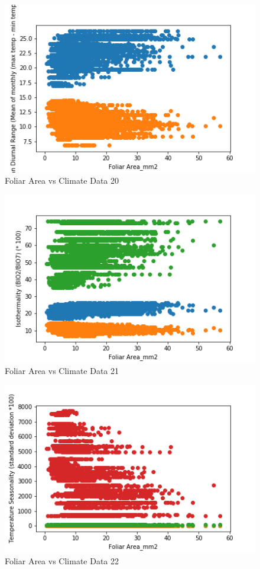 \documentclass[letterpaper]{article}
\begin{document}
\begin{figure}[h]
\caption{Foliar Area vs Climate Data 20\label{fig:Foliar_Area_vs_20}}
\centering
\includegraphics[width=0.7\paperwidth]{Foliar_Area_vs_20}
\end{figure}


\begin{figure}[h]
\caption{Foliar Area vs Climate Data 21\label{fig:Foliar_Area_vs_21}}
\centering
\includegraphics[width=0.7\paperwidth]{Foliar_Area_vs_21}
\end{figure}


\begin{figure}[h]
\caption{Foliar Area vs Climate Data 22\label{fig:Foliar_Area_vs_22}}
\centering
\includegraphics[width=0.7\paperwidth]{Foliar_Area_vs_22}
\end{figure}
\end{document}
